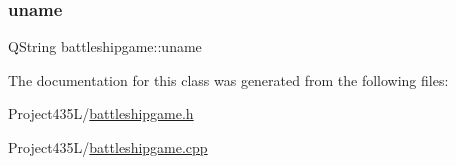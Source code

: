 \mbox{\label{classbattleshipgame_a3092de15ed568b0e0da2248f69e4d2ae}} 
\subsubsection{\texorpdfstring{uname}{uname}}
{\footnotesize\ttfamily Q\+String battleshipgame\+::uname\hspace{0.3cm}{\ttfamily [private]}}



The documentation for this class was generated from the following files\+:\begin{DoxyCompactItemize}
\item 
Project435\+L/\hyperlink{battleshipgame_8h}{battleshipgame.\+h}\item 
Project435\+L/\hyperlink{battleshipgame_8cpp}{battleshipgame.\+cpp}\end{DoxyCompactItemize}

